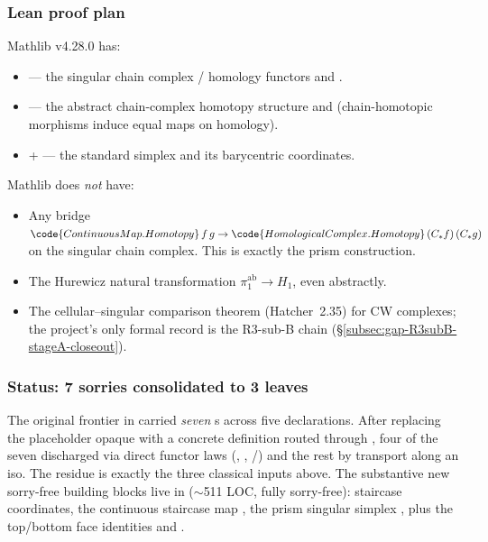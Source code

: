 \subsubsection*{Lean proof plan}

Mathlib v4.28.0 has:
\begin{itemize}
\item {} ---
  the singular chain complex / homology functors
   and .
\item {} ---
  the abstract chain-complex homotopy structure and
   (chain-homotopic morphisms
  induce equal maps on homology).
\item {} +
   ---
  the standard simplex and its barycentric coordinates.
\end{itemize}

Mathlib does \emph{not} have:
\begin{itemize}
\item Any bridge \(\code{ContinuousMap.Homotopy}\,f\,g
  \to \code{HomologicalComplex.Homotopy}\,(C_{*}f)\,(C_{*}g)\) on the
  singular chain complex.  This is exactly the prism construction.
\item The Hurewicz natural transformation \(\pi_{1}^{\mathrm{ab}}\to H_{1}\),
  even abstractly.
\item The cellular--singular comparison theorem (Hatcher~2.35) for
  CW complexes; the project's only formal record is the
  R3-sub-B chain (\S\ref{subsec:gap-R3subB-stageA-closeout}).
\end{itemize}

\subsubsection*{Status: 7 sorries consolidated to 3 leaves}

The original frontier in
 carried \emph{seven} s
across five declarations.  After replacing the placeholder
opaque  with a concrete
definition routed through ,
four of the seven discharged via direct functor laws (,
, /)
and the rest by transport along an iso.  The residue is exactly the three
classical inputs above.  The substantive new sorry-free building blocks
live in
(\(\sim\)511 LOC, fully sorry-free): staircase coordinates, the
continuous staircase map
,
the prism singular simplex , plus the top/bottom
face identities  and
.

